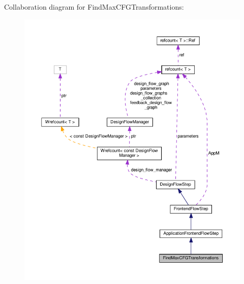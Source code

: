 Collaboration diagram for Find\+Max\+C\+F\+G\+Transformations\+:
\nopagebreak
\begin{figure}[H]
\begin{center}
\leavevmode
\includegraphics[width=350pt]{d5/d58/classFindMaxCFGTransformations__coll__graph}
\end{center}
\end{figure}
